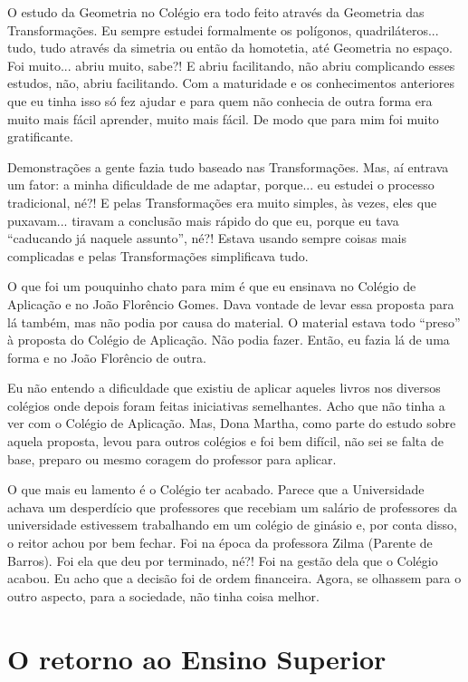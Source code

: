 \documentclass{hipatia}
\begin{document}
O estudo da Geometria no Colégio era todo feito através da Geometria das
Transformações. Eu sempre estudei formalmente os polígonos,
quadriláteros... tudo, tudo através da simetria ou então da homotetia,
até Geometria no espaço. Foi muito... abriu muito, sabe?! E abriu
facilitando, não abriu complicando esses estudos, não, abriu
facilitando. Com a maturidade e os conhecimentos anteriores que eu tinha
isso só fez ajudar e para quem não conhecia de outra forma era muito mais
fácil aprender, muito mais fácil. De modo que para mim foi muito
gratificante.

Demonstrações a gente fazia tudo baseado nas Transformações. Mas, aí
entrava um fator: a minha dificuldade de me adaptar, porque... eu
estudei o processo tradicional, né?! E pelas Transformações era muito
simples, às vezes, eles que puxavam... tiravam a conclusão mais rápido
do que eu, porque eu tava ``caducando já naquele assunto'', né?! Estava
usando sempre coisas mais complicadas e pelas Transformações
simplificava tudo.

O que foi um pouquinho chato para mim é que eu ensinava no Colégio de 
Aplicação e no João Florêncio Gomes. Dava vontade de levar essa proposta
para lá também, mas não podia por causa do material. O material estava
todo ``preso'' à proposta do Colégio de Aplicação. Não podia fazer.
Então, eu fazia lá de uma forma e no João Florêncio de outra.

Eu não entendo a dificuldade que existiu de aplicar aqueles livros nos
diversos colégios onde depois foram feitas iniciativas semelhantes. Acho
que não tinha a ver com o Colégio de Aplicação. Mas, Dona Martha, como
parte do estudo sobre aquela proposta, levou para outros colégios e foi
bem difícil, não sei se falta de base, preparo ou mesmo coragem do
professor para aplicar.

O que mais eu lamento é o Colégio ter acabado. Parece que a Universidade
achava um desperdício que professores que recebiam um salário de
professores da universidade estivessem trabalhando em um colégio de
ginásio e, por conta disso, o reitor achou por bem fechar. Foi na época
da professora Zilma (Parente de Barros). Foi ela que deu por terminado,
né?! Foi na gestão dela que o Colégio acabou. Eu acho que a decisão foi
de ordem financeira. Agora, se olhassem para o outro aspecto, para a
sociedade, não tinha coisa melhor.

\section{O retorno ao %
Ensino Superior}
\end{document}
